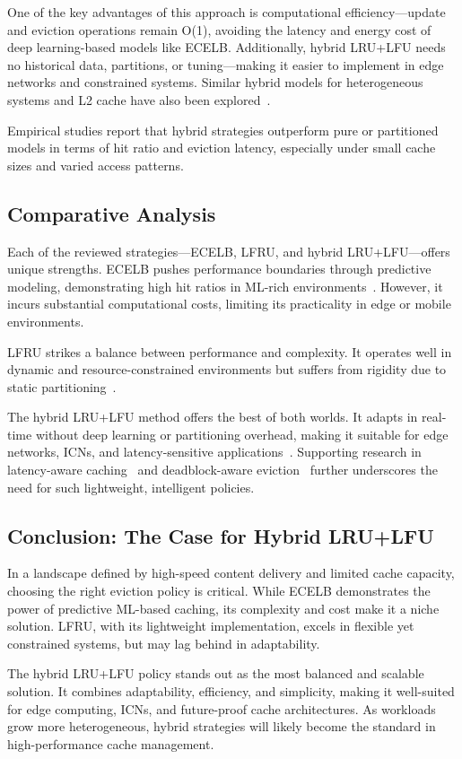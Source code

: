 One of the key advantages of this approach is computational efficiency—update and eviction operations remain O(1), avoiding the latency and energy cost of deep learning-based models like ECELB. Additionally, hybrid LRU+LFU needs no historical data, partitions, or tuning—making it easier to implement in edge networks and constrained systems. Similar hybrid models for heterogeneous systems and L2 cache have also been explored~\cite{AnandKumar2014HeterogeneousMultiCross, Lin2015HighEnduranceHybridCache}.

Empirical studies report that hybrid strategies outperform pure or partitioned models in terms of hit ratio and eviction latency, especially under small cache sizes and varied access patterns.

\subsection{Comparative Analysis}

Each of the reviewed strategies—ECELB, LFRU, and hybrid LRU+LFU—offers unique strengths. ECELB pushes performance boundaries through predictive modeling, demonstrating high hit ratios in ML-rich environments~\cite{Zhou2023CacheEviction-LearningBeladyAlgorithm}. However, it incurs substantial computational costs, limiting its practicality in edge or mobile environments.

LFRU strikes a balance between performance and complexity. It operates well in dynamic and resource-constrained environments but suffers from rigidity due to static partitioning~\cite{Bilal2017CacheManagementSchemeforEfficientContentEvictionReplication}.

The hybrid LRU+LFU method offers the best of both worlds. It adapts in real-time without deep learning or partitioning overhead, making it suitable for edge networks, ICNs, and latency-sensitive applications~\cite{shah2023ImprovedCacheEviction}. Supporting research in latency-aware caching~\cite{Saxena2024LatencyAwareDynamicCachingModel} and deadblock-aware eviction~\cite{Wu2022DeadblockAwareAdaptiveEvictionPolicy} further underscores the need for such lightweight, intelligent policies.

\subsection*{Conclusion: The Case for Hybrid LRU+LFU}

In a landscape defined by high-speed content delivery and limited cache capacity, choosing the right eviction policy is critical. While ECELB demonstrates the power of predictive ML-based caching, its complexity and cost make it a niche solution. LFRU, with its lightweight implementation, excels in flexible yet constrained systems, but may lag behind in adaptability.

The hybrid LRU+LFU policy stands out as the most balanced and scalable solution. It combines adaptability, efficiency, and simplicity, making it well-suited for edge computing, ICNs, and future-proof cache architectures. As workloads grow more heterogeneous, hybrid strategies will likely become the standard in high-performance cache management.
